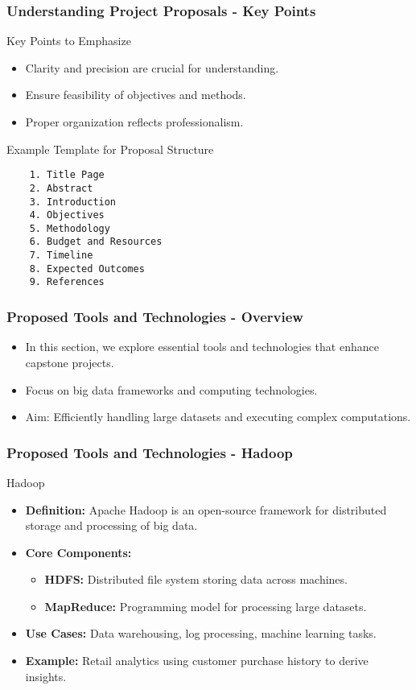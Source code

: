\documentclass[aspectratio=169]{beamer}
\begin{document}
\begin{frame}[fragile]
  \frametitle{Understanding Project Proposals - Key Points}
  \begin{block}{Key Points to Emphasize}
    \begin{itemize}
      \item Clarity and precision are crucial for understanding.
      \item Ensure feasibility of objectives and methods.
      \item Proper organization reflects professionalism.
    \end{itemize}
  \end{block}

  \begin{block}{Example Template for Proposal Structure}
    \begin{verbatim}
    1. Title Page
    2. Abstract
    3. Introduction
    4. Objectives
    5. Methodology
    6. Budget and Resources
    7. Timeline
    8. Expected Outcomes
    9. References
    \end{verbatim}
  \end{block}
\end{frame}

\begin{frame}[fragile]
    \frametitle{Proposed Tools and Technologies - Overview}
    \begin{itemize}
        \item In this section, we explore essential tools and technologies that enhance capstone projects.
        \item Focus on big data frameworks and computing technologies.
        \item Aim: Efficiently handling large datasets and executing complex computations.
    \end{itemize}
\end{frame}

\begin{frame}[fragile]
    \frametitle{Proposed Tools and Technologies - Hadoop}
    \begin{block}{Hadoop}
        \begin{itemize}
            \item \textbf{Definition:} Apache Hadoop is an open-source framework for distributed storage and processing of big data.
            \item \textbf{Core Components:}
                \begin{itemize}
                    \item \textbf{HDFS:} Distributed file system storing data across machines.
                    \item \textbf{MapReduce:} Programming model for processing large datasets.
                \end{itemize}
            \item \textbf{Use Cases:} Data warehousing, log processing, machine learning tasks.
            \item \textbf{Example:} Retail analytics using customer purchase history to derive insights.
        \end{itemize}
    \end{block}
\end{frame}
\end{document}
